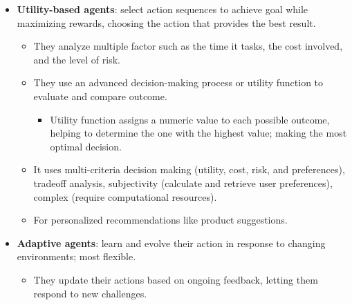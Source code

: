 \documentclass[12pt, letterpaper]{article}
\begin{document}
\begin{itemize}
        \begin{itemize}
            \item Evaluate their current state, plan possible actions, and use planning techniques to identify the best steps to reach a predefined goal by looking at future outcomes; they stay aligned even more as environment changes.
            \item Architecture: perception and input handling, memory, planning and task decomposition, and reasoning and decision making, all driven by a user-defined goal, lead to an outcome. 
            \item It is purposeful, strategic, prioritizing, and flexible.
            \item Useful as it is strategic, plan and adjust behavior - more control; good for navigation or problem solving tasks, also for tasks that span multiple systems and where long-term impact matters.
        \end{itemize}
    \item \textbf{Utility-based agents}: select action sequences to achieve goal while maximizing rewards, choosing the action that provides the best result. 
        \begin{itemize}
            \item They analyze multiple factor such as the time it tasks, the cost involved, and the level of risk.
            \item They use an advanced decision-making process or utility function to evaluate and compare outcome.
                \begin{itemize}
                    \item Utility function assigns a numeric value to each possible outcome, helping to determine the one with the highest value; making the most optimal decision.
                \end{itemize}
            \item It uses multi-criteria decision making (utility, cost, risk, and preferences), tradeoff analysis, subjectivity (calculate and retrieve user preferences), complex (require computational resources).
            \item For personalized recommendations like product suggestions.
        \end{itemize}
    \item \textbf{Adaptive agents}: learn and evolve their action in response to changing environments; most flexible.
        \begin{itemize}
            \item They update their actions based on ongoing feedback, letting them respond to new challenges.

\end{itemize}
\end{itemize}
\end{document}
